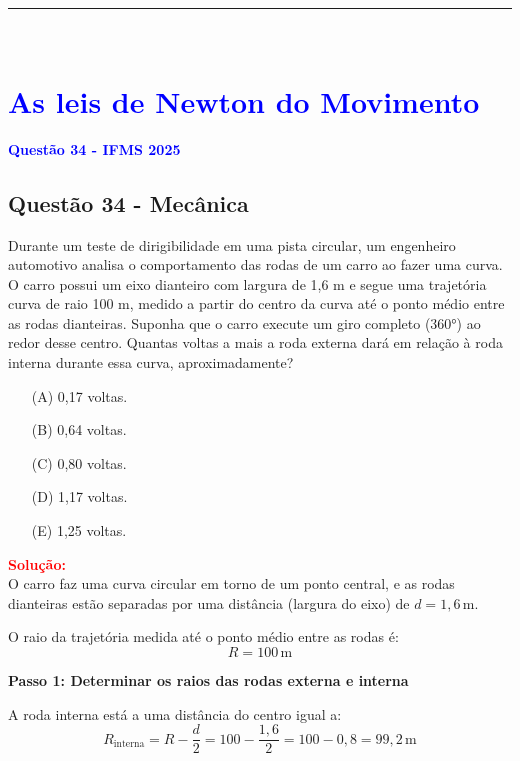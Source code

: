 \noindent\rule{\linewidth}{0.6pt}\\

\section{\large \textcolor{blue}{ As leis de Newton do Movimento}}

\begin{flushleft}
\textbf{\textcolor{blue}{\Large Quest\~ao 34 - IFMS 2025}}\\
\subsection{Quest\~ao 34 - Mecânica}
Durante um teste de dirigibilidade em uma pista circular, um engenheiro automotivo analisa o comportamento das 
rodas de um carro ao fazer uma curva. O carro possui um eixo dianteiro com largura de 1,6 m e segue uma trajetória 
curva de raio 100 m, medido a partir do centro da curva até o ponto médio entre as rodas dianteiras. Suponha que o 
carro execute um giro completo (360°) ao redor desse centro. Quantas voltas a mais a roda externa dará em relação à 
roda interna durante essa curva, aproximadamente?

\begin{itemize}
\item[(A)] 0,17 voltas.
\item[(B)] 0,64 voltas.
\item[(C)] 0,80 voltas.
\item[(D)] 1,17 voltas.
\item[(E)] 1,25 voltas.

\end{itemize}

\vspace{0.5cm}

\textcolor{red}{\textbf{Solução:}}\\

O carro faz uma curva circular em torno de um ponto central, e as rodas dianteiras estão separadas por uma distância (largura do eixo) de $d = 1,6\,\text{m}$.

O raio da trajetória medida até o ponto médio entre as rodas é:
\[
R = 100\,\text{m}
\]

\bigskip

\textbf{Passo 1: Determinar os raios das rodas externa e interna}

A roda interna está a uma distância do centro igual a:
\[
R_{\text{interna}} = R - \frac{d}{2} = 100 - \frac{1,6}{2} = 100 - 0,8 = 99,2\,\text{m}
\]


\end{flushleft}
